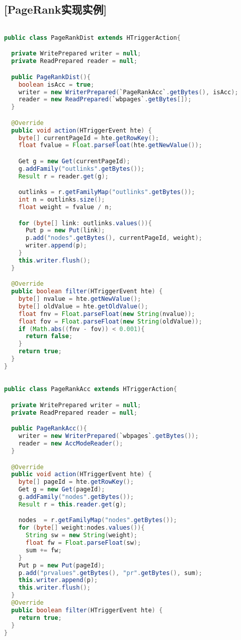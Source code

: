 \subsection{\textbf{[PageRank实现实例]}}
\label{appendix:pagerank}
\begin{lstlisting}[language=java]

public class PageRankDist extends HTriggerAction{

  private WritePrepared writer = null;
  private ReadPrepared reader = null;

  public PageRankDist(){
    boolean isAcc = true;
    writer = new WriterPrepared(`PageRankAcc`.getBytes(), isAcc);
    reader = new ReadPrepared(`wbpages`.getBytes[]);
  }

  @Override
  public void action(HTriggerEvent hte) {
    byte[] currentPageId = hte.getRowKey();
    float fvalue = Float.parseFloat(hte.getNewValue());

    Get g = new Get(currentPageId);
    g.addFamily("outlinks".getBytes());
    Result r = reader.get(g);

    outlinks = r.getFamilyMap("outlinks".getBytes());
    int n = outlinks.size();
    float weight = fvalue / n;

    for (byte[] link: outlinks.values()){
      Put p = new Put(link);
      p.add("nodes".getBytes(), currentPageId, weight);
      writer.append(p);
    }
    this.writer.flush();
  }

  @Override
  public boolean filter(HTriggerEvent hte) {
    byte[] nvalue = hte.getNewValue();
    byte[] oldValue = hte.getOldValue();
    float fnv = Float.parseFloat(new String(nvalue));
    float fov = Float.parseFloat(new String(oldValue));
    if (Math.abs((fnv - fov)) < 0.001){
      return false;
    }
    return true;
  }
}
\end{lstlisting}

\begin{lstlisting}[language=java]

public class PageRankAcc extends HTriggerAction{

  private WritePrepared writer = null;
  private ReadPrepared reader = null;

  public PageRankAcc(){
    writer = new WriterPrepared(`wbpages`.getBytes());
    reader = new AccModeReader();
  }

  @Override
  public void action(HTriggerEvent hte) {
    byte[] pageId = hte.getRowKey();
    Get g = new Get(pageId);
    g.addFamily("nodes".getBytes());
    Result r = this.reader.get(g);

    nodes  = r.getFamilyMap("nodes".getBytes());
    for (byte[] weight:nodes.values()){
      String sw = new String(weight);
      float fw = Float.parseFloat(sw);
      sum += fw;
    }
    Put p = new Put(pageId);
    p.add("prvalues".getBytes(), "pr".getBytes(), sum);
    this.writer.append(p);
    this.writer.flush();
  }
  @Override
  public boolean filter(HTriggerEvent hte) {
    return true;
  }
}

\end{lstlisting}
